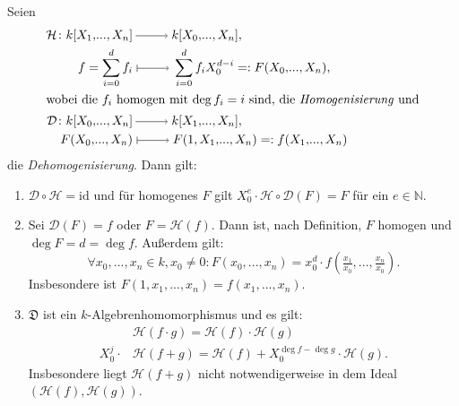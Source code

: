 \documentclass[a4paper,12pt]{scrbook}
\newcommand{\D}{\mathfrak{D}}
\newcommand{\DD}{\mathcal{D}} %
\renewcommand{\H}{\mathcal{H}} %
\newcommand{\id}{\mathrm{id}}
\renewcommand{\dotsc}{\ensuremath{\!...}}
\newcommand{\set}[1]{\ensuremath{\mathbb{#1}}}
\newcommand{\N}{\set{N}}
\newcommand{\ra}{\raisebox{-1pt}{\tikz{\draw[thin,shorten >=3pt, ->] (0,0) node{\hspace*{-2pt}} -- node{} (1,0);}}\penalty1000\relax}
\renewcommand{\mapsto}{\raisebox{-1pt}{\tikz{\draw[thin,shorten >=3pt, |->] (0,0) node{\hspace*{0pt}} -- node{} (1,0);}}\penalty1000\relax}
\newcommand{\polyx}[1][n]{\ensuremath%
  [X_{1},\dotsc,X_{#1}]}
\newcommand{\ppolyx}[1][n]{\ensuremath%
  [X_{0},\dotsc,X_{#1}]}
\begin{document}
\begin{dl}\label{2.3.9} Seien
\begin{align*}\H\colon k\polyx&\ra k\ppolyx,\\
 f=\sum_{i=0}^{d}f_{i}&\mapsto\sum_{i=0}^{d}f_{i}X_{0}^{d-i}=:F(X_{0},\dotsc,X_{n}),\\
\intertext{wobei die $f_{i}$ homogen mit $\deg f_{i}=i$ sind, die \emph{Homogenisierung} und}
\DD\colon k\ppolyx&\ra k\polyx,\\
F(X_{0},\dotsc,X_{n})&\mapsto F(1,X_{1},\dotsc,X_{n})=:f(X_{1},\dotsc,X_{n})\end{align*}
die \emph{Dehomogenisierung}. Dann gilt:
\begin{enumerate}
\item{} $\DD\circ \H=\id$ und für homogenes $F$ gilt $X_{0}^{e}\cdot \H\circ \DD(F)=F$ für ein $e\in\N$.
\item{} Sei $\DD(F)=f$ oder $F=\H(f)$. Dann ist, nach Definition, $F$ homogen und $\deg F=d=\deg f$. Außerdem gilt:\vspace*{-6pt}
\[\forall x_{0},\dotsc,x_{n}\in k, x_{0}\neq 0\colon  F(x_{0},\dotsc,x_{n})=x_{0}^{d}\cdot f(\tfrac{x_{1}}{x_{0}},\dotsc,\tfrac{x_{n}}{x_{0}}).\]
Insbesondere ist $F(1,x_{1},\dotsc,x_{n}) = f(x_{1},\dotsc,x_{n})$.
\item{} $\D$ ist ein $k$-Algebrenhomomorphismus und es gilt:
\begin{align*}
&\H(f\cdot g)=\H(f)\cdot \H(g)\\
X_{0}^{j}\cdot&\H(f+g)=\H(f)+X_{0}^{\deg f-\deg g}\cdot \H(g).\end{align*}
Insbesondere liegt $\H(f+g)$ nicht notwendigerweise in dem Ideal $(\H(f),\H(g))$.
\end{enumerate}\end{dl}
%
\end{document}
